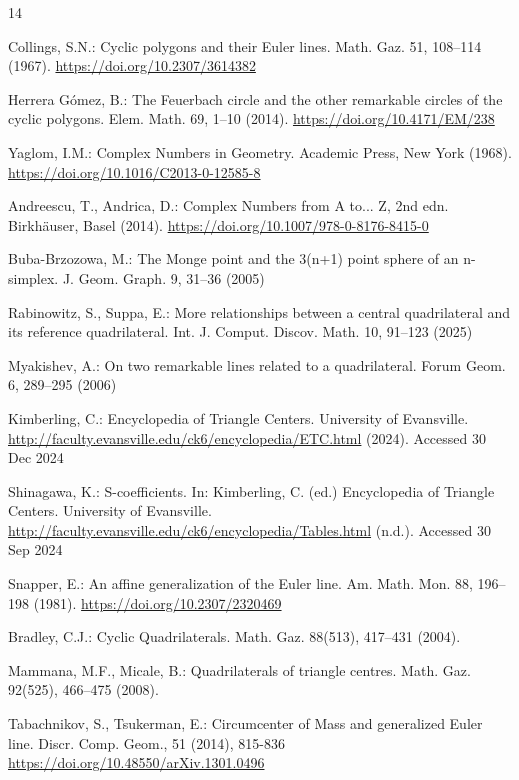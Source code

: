 \documentclass{birkjour}
\theoremstyle{definition}
\theoremstyle{remark}
\numberwithin{equation}{section}
\begin{document}
\begin{thebibliography}{14}

     Collings, S.N.: Cyclic polygons and their Euler lines. Math. Gaz. 51, 108--114 (1967). \url{https://doi.org/10.2307/3614382} 
    
     Herrera Gómez, B.: The Feuerbach circle and the other remarkable circles of the cyclic polygons. Elem. Math. 69, 1--10 (2014). \url{https://doi.org/10.4171/EM/238}
    
     Yaglom, I.M.: Complex Numbers in Geometry. Academic Press, New York (1968). \url{https://doi.org/10.1016/C2013-0-12585-8}
    
     Andreescu, T., Andrica, D.: Complex Numbers from A to... Z, 2nd edn. Birkhäuser, Basel (2014). \url{https://doi.org/10.1007/978-0-8176-8415-0}
    
     Buba-Brzozowa, M.: The Monge point and the 3(n+1) point sphere of an n-simplex. J. Geom. Graph. 9, 31--36 (2005)
    
     Rabinowitz, S., Suppa, E.: More relationships between a central quadrilateral and its reference quadrilateral. Int. J. Comput. Discov. Math. 10, 91--123 (2025)
    
     Myakishev, A.: On two remarkable lines related to a quadrilateral. Forum Geom. 6, 289--295 (2006)
    
     Kimberling, C.: Encyclopedia of Triangle Centers. University of Evansville. \url{http://faculty.evansville.edu/ck6/encyclopedia/ETC.html} (2024). Accessed 30 Dec 2024
    
     Shinagawa, K.: S-coefficients. In: Kimberling, C. (ed.) Encyclopedia of Triangle Centers. University of Evansville. \url{http://faculty.evansville.edu/ck6/encyclopedia/Tables.html} (n.d.). Accessed 30 Sep 2024
    
     Snapper, E.: An affine generalization of the Euler line. Am. Math. Mon. 88, 196--198 (1981). \url{https://doi.org/10.2307/2320469}

     Bradley, C.J.: Cyclic Quadrilaterals. Math. Gaz. 88(513), 417--431 (2004). 

     Mammana, M.F., Micale, B.: Quadrilaterals of triangle centres. Math. Gaz. 92(525), 466--475 (2008).

     Tabachnikov, S., Tsukerman, E.:  Circumcenter of Mass and generalized Euler line. Discr. Comp. Geom., 51 (2014), 815-836 \url{https://doi.org/10.48550/arXiv.1301.0496}
    
\end{thebibliography}
\end{document}
